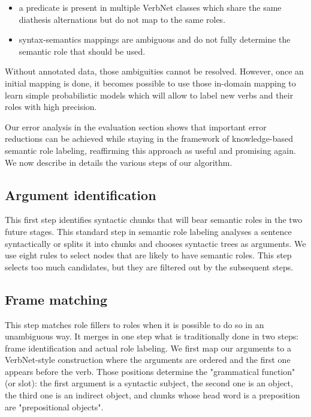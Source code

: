 \begin{itemize}

    \item a predicate is present in multiple VerbNet classes which share the same
    diathesis alternations but do not map to the same roles.

    \item syntax-semantics mappings are ambiguous and do not fully determine the
    semantic role that should be used.

\end{itemize}

Without annotated data, those ambiguities cannot be resolved. However, once an
initial mapping is done, it becomes possible to use those in-domain mapping to
learn simple probabilistic models which will allow to label new verbs and their
roles with high precision.

Our error analysis in the evaluation section shows that important error 
reductions can be achieved while
staying in the framework of knowledge-based semantic role labeling, reaffirming
this approach as useful and promising again. We now describe in details the 
various steps of our algorithm.

\subsection{Argument identification}

This first step identifies syntactic chunks that will bear semantic roles in the two
future stages.  This standard step in semantic role labeling analyses a
sentence syntactically or splits it into chunks and chooses syntactic trees as
arguments.  We use \citep{lang2011unsupervised} eight rules to select
nodes that are likely to have semantic roles. This step selects too much
candidates, but they are filtered out by the subsequent steps.

\subsection{Frame matching}

This step matches role fillers to roles when it is possible to do so in an
unambiguous way. It merges in one step what is traditionally done in two steps:
frame identification and actual role labeling. We first map our arguments to a
VerbNet-style construction where the arguments are ordered and the first one
appears before the verb. Those positions determine the "grammatical function"
(or slot): the first argument is a syntactic subject, the second one is an
object, the third one is an indirect object, and chunks whose head word is a
preposition are "prepositional objects".

